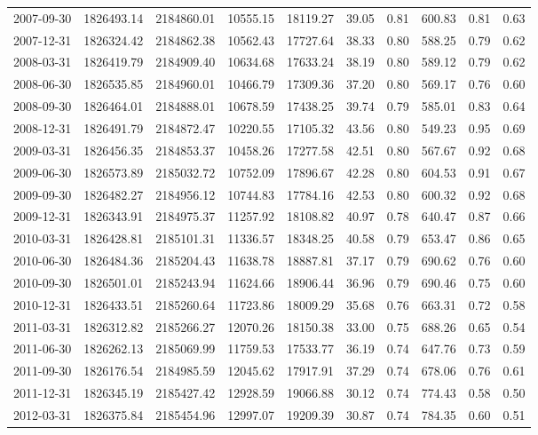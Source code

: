 \begin{landscape}
\begin{longtable}{llllllllll}
2007-09-30 & 1826493.14 & 2184860.01 & 10555.15 & 18119.27 & 39.05 & 0.81 & 600.83 & 0.81 & 0.63 \\
2007-12-31 & 1826324.42 & 2184862.38 & 10562.43 & 17727.64 & 38.33 & 0.80 & 588.25 & 0.79 & 0.62 \\
2008-03-31 & 1826419.79 & 2184909.40 & 10634.68 & 17633.24 & 38.19 & 0.80 & 589.12 & 0.79 & 0.62 \\
2008-06-30 & 1826535.85 & 2184960.01 & 10466.79 & 17309.36 & 37.20 & 0.80 & 569.17 & 0.76 & 0.60 \\
2008-09-30 & 1826464.01 & 2184888.01 & 10678.59 & 17438.25 & 39.74 & 0.79 & 585.01 & 0.83 & 0.64 \\
2008-12-31 & 1826491.79 & 2184872.47 & 10220.55 & 17105.32 & 43.56 & 0.80 & 549.23 & 0.95 & 0.69 \\
2009-03-31 & 1826456.35 & 2184853.37 & 10458.26 & 17277.58 & 42.51 & 0.80 & 567.67 & 0.92 & 0.68 \\
2009-06-30 & 1826573.89 & 2185032.72 & 10752.09 & 17896.67 & 42.28 & 0.80 & 604.53 & 0.91 & 0.67 \\
2009-09-30 & 1826482.27 & 2184956.12 & 10744.83 & 17784.16 & 42.53 & 0.80 & 600.32 & 0.92 & 0.68 \\
2009-12-31 & 1826343.91 & 2184975.37 & 11257.92 & 18108.82 & 40.97 & 0.78 & 640.47 & 0.87 & 0.66 \\
2010-03-31 & 1826428.81 & 2185101.31 & 11336.57 & 18348.25 & 40.58 & 0.79 & 653.47 & 0.86 & 0.65 \\
2010-06-30 & 1826484.36 & 2185204.43 & 11638.78 & 18887.81 & 37.17 & 0.79 & 690.62 & 0.76 & 0.60 \\
2010-09-30 & 1826501.01 & 2185243.94 & 11624.66 & 18906.44 & 36.96 & 0.79 & 690.46 & 0.75 & 0.60 \\
2010-12-31 & 1826433.51 & 2185260.64 & 11723.86 & 18009.29 & 35.68 & 0.76 & 663.31 & 0.72 & 0.58 \\
2011-03-31 & 1826312.82 & 2185266.27 & 12070.26 & 18150.38 & 33.00 & 0.75 & 688.26 & 0.65 & 0.54 \\
2011-06-30 & 1826262.13 & 2185069.99 & 11759.53 & 17533.77 & 36.19 & 0.74 & 647.76 & 0.73 & 0.59 \\
2011-09-30 & 1826176.54 & 2184985.59 & 12045.62 & 17917.91 & 37.29 & 0.74 & 678.06 & 0.76 & 0.61 \\
2011-12-31 & 1826345.19 & 2185427.42 & 12928.59 & 19066.88 & 30.12 & 0.74 & 774.43 & 0.58 & 0.50 \\
2012-03-31 & 1826375.84 & 2185454.96 & 12997.07 & 19209.39 & 30.87 & 0.74 & 784.35 & 0.60 & 0.51 \\

\end{longtable}
\end{landscape}
